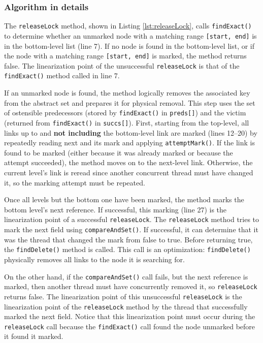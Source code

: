 \subsubsection*{Algorithm in details}

The \texttt{releaseLock} method, shown in Listing \ref{lst:releaseLock}, calls \texttt{findExact()} to determine whether an unmarked node with a matching range \texttt{[start, end]} is in the bottom-level list (line 7). 
If no node is found in the bottom-level list, or if the node with a matching range \texttt{[start, end]} is marked, the method returns false. 
The linearization point of the unsuccessful \texttt{releaseLock} is that of the \texttt{findExact()} method called in line 7. 

If an unmarked node is found, the method logically removes the associated key from the abstract set and prepares it for physical removal. 
This step uses the set of ostensible predecessors (stored by \texttt{findExact()} in \texttt{preds[]}) and the victim (returned from \texttt{findExact()} in \texttt{succs[]}). 
First, starting from the top-level, all links up to and \textbf{not including} the bottom-level link are marked (lines 12--20) by repeatedly reading next and its mark and applying \texttt{attemptMark()}. 
If the link is found to be marked (either because it was already marked or because the attempt succeeded), the method moves on to the next-level link. 
Otherwise, the current level's link is reread since another concurrent thread must have changed it, so the marking attempt must be repeated. 

Once all levels but the bottom one have been marked, the method marks the bottom level's next reference. 
If successful, this marking (line 27) is the linearization point of a successful \texttt{releaseLock}. 
The \texttt{releaseLock} method tries to mark the next field using \texttt{compareAndSet()}. 
If successful, it can determine that it was the thread that changed the mark from false to true. 
Before returning true, the \texttt{findDelete()} method is called. 
This call is an optimization: \texttt{findDelete()} physically removes all links to the node it is searching for.

On the other hand, if the  \texttt{compareAndSet()} call fails, but the next reference is marked, then another thread must have concurrently removed it, so \texttt{releaseLock} returns false. 
The linearization point of this unsuccessful \texttt{releaseLock} is the linearization point of the \texttt{releaseLock} method by the thread that successfully marked the next field. 
Notice that this linearization point must occur during the \texttt{releaseLock} call because the \texttt{findExact()} call found the node unmarked before it found it marked.


